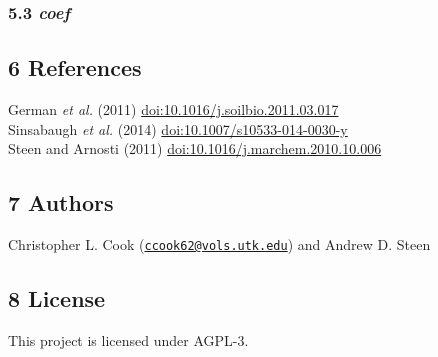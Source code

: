\documentclass[
]{article}
\begin{document}
\hypertarget{coef}{%
\subsubsection{\texorpdfstring{5.3 \emph{coef}}{5.3 coef}}\label{coef}}

\hypertarget{references}{%
\subsection{6 References}\label{references}}

German \emph{et al.} (2011) \url{doi:10.1016/j.soilbio.2011.03.017}\\
Sinsabaugh \emph{et al.} (2014) \url{doi:10.1007/s10533-014-0030-y}\\
Steen and Arnosti (2011) \url{doi:10.1016/j.marchem.2010.10.006}

\hypertarget{authors}{%
\subsection{7 Authors}\label{authors}}

Christopher L. Cook
(\href{mailto:ccook62@vols.utk.edu}{\nolinkurl{ccook62@vols.utk.edu}})
and Andrew D. Steen

\hypertarget{license}{%
\subsection{8 License}\label{license}}

This project is licensed under AGPL-3.
\end{document}
